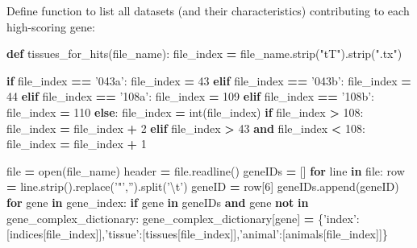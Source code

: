 \documentclass[
]{article}
\newenvironment{Shaded}{\begin{snugshade}}{\end{snugshade}}
\newcommand{\BuiltInTok}[1]{#1}
\newcommand{\CharTok}[1]{\textcolor[rgb]{0.31,0.60,0.02}{#1}}
\newcommand{\ControlFlowTok}[1]{\textcolor[rgb]{0.13,0.29,0.53}{\textbf{#1}}}
\newcommand{\DecValTok}[1]{\textcolor[rgb]{0.00,0.00,0.81}{#1}}
\newcommand{\KeywordTok}[1]{\textcolor[rgb]{0.13,0.29,0.53}{\textbf{#1}}}
\newcommand{\NormalTok}[1]{#1}
\newcommand{\OperatorTok}[1]{\textcolor[rgb]{0.81,0.36,0.00}{\textbf{#1}}}
\newcommand{\StringTok}[1]{\textcolor[rgb]{0.31,0.60,0.02}{#1}}
\begin{document}
Define function to list all datasets (and their characteristics)
contributing to each high-scoring gene:

\begin{Shaded}
\begin{Highlighting}[]
\KeywordTok{def}\NormalTok{ tissues_for_hits(file_name):}
\NormalTok{  file_index }\OperatorTok{=}\NormalTok{ file_name.strip(}\StringTok{"tT"}\NormalTok{).strip(}\StringTok{".tx"}\NormalTok{)}
  
  \ControlFlowTok{if}\NormalTok{ file_index }\OperatorTok{==} \StringTok{'043a'}\NormalTok{:}
\NormalTok{    file_index }\OperatorTok{=} \DecValTok{43}
  \ControlFlowTok{elif}\NormalTok{ file_index }\OperatorTok{==} \StringTok{'043b'}\NormalTok{:}
\NormalTok{    file_index }\OperatorTok{=} \DecValTok{44}
  \ControlFlowTok{elif}\NormalTok{ file_index }\OperatorTok{==} \StringTok{'108a'}\NormalTok{:}
\NormalTok{    file_index }\OperatorTok{=} \DecValTok{109}
  \ControlFlowTok{elif}\NormalTok{ file_index }\OperatorTok{==} \StringTok{'108b'}\NormalTok{:}
\NormalTok{    file_index }\OperatorTok{=} \DecValTok{110}
  \ControlFlowTok{else}\NormalTok{:}
\NormalTok{    file_index }\OperatorTok{=} \BuiltInTok{int}\NormalTok{(file_index)}
    \ControlFlowTok{if}\NormalTok{ file_index }\OperatorTok{>} \DecValTok{108}\NormalTok{:}
\NormalTok{      file_index }\OperatorTok{=}\NormalTok{ file_index }\OperatorTok{+} \DecValTok{2}
    \ControlFlowTok{elif}\NormalTok{ file_index }\OperatorTok{>} \DecValTok{43} \KeywordTok{and}\NormalTok{ file_index }\OperatorTok{<} \DecValTok{108}\NormalTok{:}
\NormalTok{      file_index }\OperatorTok{=}\NormalTok{ file_index }\OperatorTok{+} \DecValTok{1}

  \BuiltInTok{file} \OperatorTok{=} \BuiltInTok{open}\NormalTok{(file_name)}
\NormalTok{  header }\OperatorTok{=} \BuiltInTok{file}\NormalTok{.readline()}
\NormalTok{  geneIDs }\OperatorTok{=}\NormalTok{ []}
  \ControlFlowTok{for}\NormalTok{ line }\KeywordTok{in} \BuiltInTok{file}\NormalTok{:}
\NormalTok{    row }\OperatorTok{=}\NormalTok{ line.strip().replace(}\StringTok{'"'}\NormalTok{,}\StringTok{''}\NormalTok{).split(}\StringTok{'}\CharTok{\textbackslash{}t}\StringTok{'}\NormalTok{)}
\NormalTok{    geneID }\OperatorTok{=}\NormalTok{ row[}\DecValTok{6}\NormalTok{]}
\NormalTok{    geneIDs.append(geneID)}
  \ControlFlowTok{for}\NormalTok{ gene }\KeywordTok{in}\NormalTok{ gene_index:}
    \ControlFlowTok{if}\NormalTok{ gene }\KeywordTok{in}\NormalTok{ geneIDs }\KeywordTok{and}\NormalTok{ gene }\KeywordTok{not} \KeywordTok{in}\NormalTok{ gene_complex_dictionary:}
\NormalTok{      gene_complex_dictionary[gene] }\OperatorTok{=}\NormalTok{ \{}\StringTok{'index'}\NormalTok{:[indices[file_index]],}\StringTok{'tissue'}\NormalTok{:[tissues[file_index]],}\StringTok{'animal'}\NormalTok{:[animals[file_index]]\}}


\end{Highlighting}
\end{Shaded}
\end{document}
